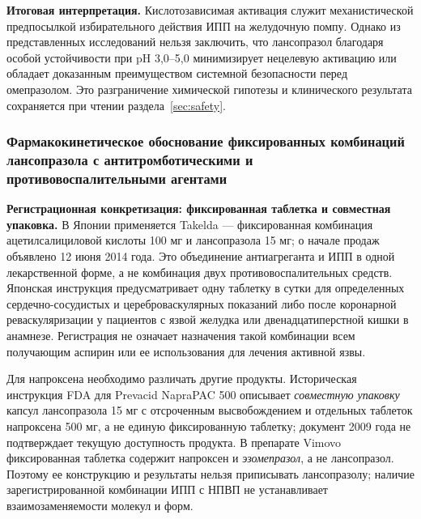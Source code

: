\documentclass[11pt,a4paper,notitlepage]{report}
\newcommand{\src}[1]{\unskip\space\cite{#1}}
\begin{document}
\textbf{Итоговая интерпретация.} Кислотозависимая активация служит механистической предпосылкой избирательного действия ИПП на желудочную помпу. Однако из представленных исследований нельзя заключить, что лансопразол благодаря особой устойчивости при pH 3,0--5,0 минимизирует нецелевую активацию или обладает доказанным преимуществом системной безопасности перед омепразолом. Это разграничение химической гипотезы и клинического результата сохраняется при чтении раздела~\ref{sec:safety}.\src{molchem,molkinetics,molphselect1998}

\subsubsection{Фармакокинетическое обоснование фиксированных комбинаций лансопразола с антитромботическими и противовоспалительными агентами}
\label{sec:fixed-combinations}

\textbf{Регистрационная конкретизация: фиксированная таблетка и совместная упаковка.} В Японии применяется Takelda --- фиксированная комбинация ацетилсалициловой кислоты 100 мг и лансопразола 15 мг; о начале продаж объявлено 12 июня 2014 года. Это объединение антиагреганта и ИПП в одной лекарственной форме, а не комбинация двух противовоспалительных средств.\src{fdctakeldalaunch} Японская инструкция предусматривает одну таблетку в сутки для определенных сердечно-сосудистых и цереброваскулярных показаний либо после коронарной реваскуляризации у пациентов с язвой желудка или двенадцатиперстной кишки в анамнезе. Регистрация не означает назначения такой комбинации всем получающим аспирин или ее использования для лечения активной язвы.\src{fdctakeldalabel}

Для напроксена необходимо различать другие продукты. Историческая инструкция FDA для Prevacid NapraPAC 500 описывает \emph{совместную упаковку} капсул лансопразола 15 мг с отсроченным высвобождением и отдельных таблеток напроксена 500 мг, а не единую фиксированную таблетку; документ 2009 года не подтверждает текущую доступность продукта.\src{fdcnaprapac} В препарате Vimovo фиксированная таблетка содержит напроксен и \emph{эзомепразол}, а не лансопразол. Поэтому ее конструкцию и результаты нельзя приписывать лансопразолу; наличие зарегистрированной комбинации ИПП с НПВП не устанавливает взаимозаменяемости молекул и форм.\src{fdcvimovo}
\end{document}

